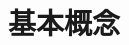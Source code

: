 \documentclass[11pt,a4paper,openany]{book}
\begin{document}
\pagestyle{plain}  %
\chapter{基本概念}
\end{document}
